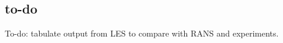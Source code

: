 \documentclass[xcolor=x11names,compress]{beamer}
\renewcommand{\(}{\begin{columns}}
\renewcommand{\)}{\end{columns}}
\newcommand{\<}[1]{\begin{column}{#1}}
\renewcommand{\>}{\end{column}}
\begin{document}
\subsection{to-do}
	
	\begin{frame}{}

		To-do: tabulate output from LES to compare with RANS and experiments.

	\end{frame}



\end{document}
